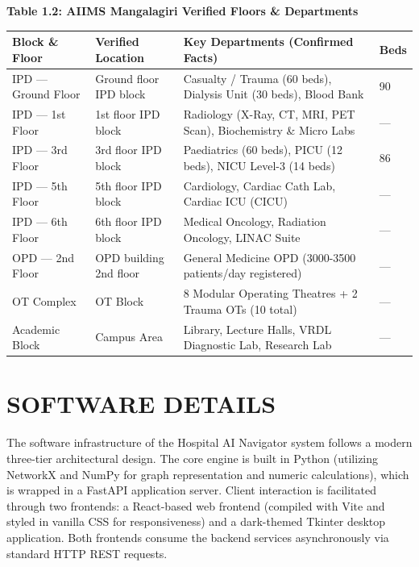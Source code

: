 \documentclass[12pt,a4paper]{report}
\begin{document}
\begin{center}\textbf{Table 1.2: AIIMS Mangalagiri Verified Floors \& Departments}\end{center}
\begin{table}[htbp]
\centering
\small
\begin{tabularx}{\textwidth}{|l|l|X|l|}
\hline
Block \& Floor & Verified Location & Key Departments (Confirmed Facts) & Beds \\
\hline
\hline
IPD --- Ground Floor & Ground floor IPD block & Casualty / Trauma (60 beds), Dialysis Unit (30 beds), Blood Bank & 90 \\
\hline
IPD --- 1st Floor & 1st floor IPD block & Radiology (X-Ray, CT, MRI, PET Scan), Biochemistry \& Micro Labs & --- \\
\hline
IPD --- 3rd Floor & 3rd floor IPD block & Paediatrics (60 beds), PICU (12 beds), NICU Level-3 (14 beds) & 86 \\
\hline
IPD --- 5th Floor & 5th floor IPD block & Cardiology, Cardiac Cath Lab, Cardiac ICU (CICU) & --- \\
\hline
IPD --- 6th Floor & 6th floor IPD block & Medical Oncology, Radiation Oncology, LINAC Suite & --- \\
\hline
OPD --- 2nd Floor & OPD building 2nd floor & General Medicine OPD (3000-3500 patients/day registered) & --- \\
\hline
OT Complex & OT Block & 8 Modular Operating Theatres + 2 Trauma OTs (10 total) & --- \\
\hline
Academic Block & Campus Area & Library, Lecture Halls, VRDL Diagnostic Lab, Research Lab & --- \\
\hline
\end{tabularx}
\end{table}

\chapter{SOFTWARE DETAILS}

The software infrastructure of the Hospital AI Navigator system follows a modern three-tier architectural design. The core engine is built in Python (utilizing NetworkX and NumPy for graph representation and numeric calculations), which is wrapped in a FastAPI application server. Client interaction is facilitated through two frontends: a React-based web frontend (compiled with Vite and styled in vanilla CSS for responsiveness) and a dark-themed Tkinter desktop application. Both frontends consume the backend services asynchronously via standard HTTP REST requests.
\end{document}
